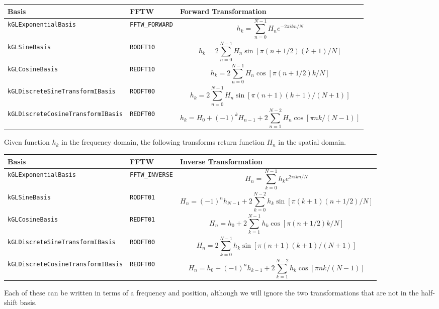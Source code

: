 \documentclass[11pt]{article}
\begin{document}
\begin{tabular}{llL}
      \hline
      Basis & FFTW & Forward Transformation \tabularnewline \hline \hline
      \verb"kGLExponentialBasis" & \verb"FFTW_FORWARD" & \[ h_k = \sum_{n=0}^{N-1} H_n e^{-2\pi i k n/N} \] \tabularnewline
      \verb"kGLSineBasis" & \verb"RODFT10" & \[ h_k = 2 \sum_{n=0}^{N-1} H_n \sin \left[ \pi(n+1/2)(k+1)/N\right] \] \tabularnewline
      \verb"kGLCosineBasis" & \verb"REDFT10" & \[ h_k = 2 \sum_{n=0}^{N-1} H_n \cos \left[ \pi (n+1/2)k/N\right] \] \tabularnewline
      \verb"kGLDiscreteSineTransformIBasis" & \verb"RODFT00" & \[ h_k = 2 \sum_{n=0}^{N-1} H_n \sin \left[ \pi(n+1)(k+1)/(N+1)\right] \] \tabularnewline
      \verb"kGLDiscreteCosineTransformIBasis" & \verb"REDFT00" & \[ h_k = H_{0} + (-1)^{k} H_{n-1} +  2 \sum_{n=1}^{N-2} H_n \cos \left[ \pi n k/(N-1)\right] \] \tabularnewline
      \hline
\end{tabular}

Given function $h_k$ in the frequency domain, the following transforms return function $H_n$ in the spatial domain.

\begin{tabular}{llL}
      \hline
      Basis & FFTW & Inverse Transformation \tabularnewline \hline \hline
      \verb"kGLExponentialBasis" & \verb"FFTW_INVERSE" & \[ H_n = \sum_{k=0}^{N-1} h_k e^{2\pi i k n/N} \] \tabularnewline
      \verb"kGLSineBasis" & \verb"RODFT01" & \[ H_n = (-1)^n h_{N-1} + 2 \sum_{k=0}^{N-2} h_k \sin \left[ \pi(k+1)(n+1/2)/N\right] \] \tabularnewline
      \verb"kGLCosineBasis" & \verb"REDFT01" & \[ H_n = h_{0} + 2 \sum_{k=1}^{N-1} h_k \cos \left[ \pi (n+1/2)k/N\right] \] \tabularnewline
      \verb"kGLDiscreteSineTransformIBasis" & \verb"RODFT00" & \[ H_n = 2 \sum_{k=0}^{N-1} h_k \sin \left[ \pi(n+1)(k+1)/(N+1)\right] \] \tabularnewline
      \verb"kGLDiscreteCosineTransformIBasis" & \verb"REDFT00" & \[ H_n = h_{0} + (-1)^{n} h_{k-1} +  2 \sum_{k=1}^{N-2} h_k \cos \left[ \pi n k/(N-1)\right] \] \tabularnewline
      \hline
\end{tabular}

Each of these can be written in terms of a frequency and position, although we will ignore the two transformations that are not in the half-shift basis.
\end{document}
